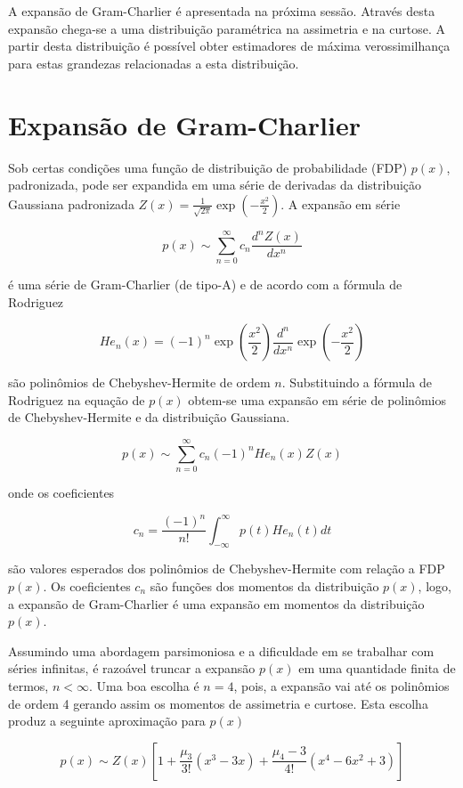 \documentclass[
  letterpaper,
  DIV=11,
  numbers=noendperiod]{scrartcl}
\begin{document}
A expansão de Gram-Charlier é apresentada na próxima sessão. Através
desta expansão chega-se a uma distribuição paramétrica na assimetria e
na curtose. A partir desta distribuição é possível obter estimadores de
máxima verossimilhança para estas grandezas relacionadas a esta
distribuição.

\section{Expansão de Gram-Charlier}\label{expansuxe3o-de-gram-charlier}

Sob certas condições uma função de distribuição de probabilidade (FDP)
\(p(x)\), padronizada, pode ser expandida em uma série de derivadas da
distribuição Gaussiana padronizada
\(Z(x) = \frac{1}{\sqrt{2\pi}}\exp\left(-\frac{x^2}{2}\right)\). A
expansão em série

\[
p(x) \sim \sum_{n=0}^\infty c_n \frac{d^n Z(x)}{dx^n}
\]

é uma série de Gram-Charlier (de tipo-A) e de acordo com a fórmula de
Rodriguez

\[
He_n(x) = (-1)^n \exp\left( \frac{x^2}{2} \right) \frac{d^n}{dx^n} \exp\left( -\frac{x^2}{2} \right)
\]

são polinômios de Chebyshev-Hermite de ordem \(n\). Substituindo a
fórmula de Rodriguez na equação de \(p(x)\) obtem-se uma expansão em
série de polinômios de Chebyshev-Hermite e da distribuição Gaussiana.

\[
p(x) \sim \sum_{n=0}^\infty c_n (-1)^n He_n(x) Z(x)
\]

onde os coeficientes

\[
c_n = \frac{(-1)^n}{n!} \int_{-\infty}^{\infty} p(t) He_n(t) dt
\]

são valores esperados dos polinômios de Chebyshev-Hermite com relação a
FDP \(p(x)\). Os coeficientes \(c_n\) são funções dos momentos da
distribuição \(p(x)\), logo, a expansão de Gram-Charlier é uma expansão
em momentos da distribuição \(p(x)\).

Assumindo uma abordagem parsimoniosa e a dificuldade em se trabalhar com
séries infinitas, é razoável truncar a expansão \(p(x)\) em uma
quantidade finita de termos, \(n < \infty\). Uma boa escolha é \(n=4\),
pois, a expansão vai até os polinômios de ordem 4 gerando assim os
momentos de assimetria e curtose. Esta escolha produz a seguinte
aproximação para \(p(x)\)

\[
p(x) \sim Z(x)\left[ 1 + \frac{\mu_3}{3!} (x^3 - 3x) + \frac{\mu_4 - 3}{4!} (x^4 - 6x^2 + 3) \right]
\]
\end{document}

